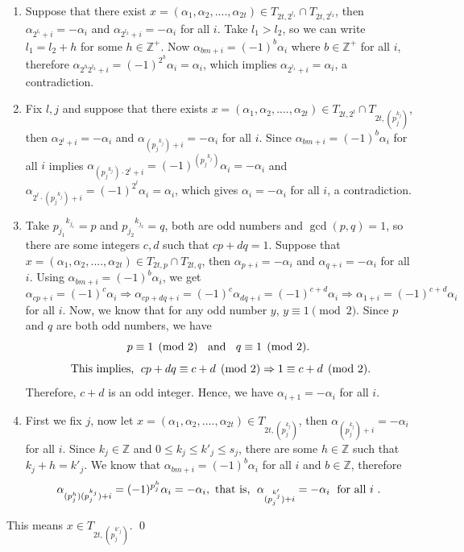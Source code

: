 \documentclass[a4paper,12pt]{amsart}
\renewenvironment{proof}{{\bfseries Proof.}}{\qed}
\numberwithin{equation}{section}
\theoremstyle{definition}
\newcommand{\imp}{\Rightarrow}
\newcommand{\z}{\mathbb{Z}}
\numberwithin{equation}{section}
\begin{document}
\begin{proof}
\begin {enumerate}
\item Suppose that there exist $x = (\alpha_1,\alpha_2,....,\alpha_{2t}) \in T_{2t, 2^{l_1}} \cap T_{2t, 2^{l_2}}$, then $\alpha_{2^{l_!}+i}=-\alpha_i$ and $\alpha_{2^{l_2}+i}=-\alpha_i$ for all $i$. Take $l_1 >l_2$, so we can write $l_1 = l_2+h $ for some $h \in \mathbb{Z}^+$. Now $\alpha_{bm +i}=(-1)^b \alpha_i$ where $b \in \mathbb{Z}^+$ for all $i$, therefore $\alpha_{2^h 2^{l_2} +i} =(-1)^{2^h}\alpha_i=\alpha_i$, which implies $\alpha_{2^{l_1}+i}=\alpha_i$, a contradiction.

\item Fix $l, j$ and suppose that there exists $x = (\alpha_1,\alpha_2,....,\alpha_{2t}) \in T_{2t, 2^{l}} \cap T_{2t, (p_j^{k_j})}$, then $\alpha_{2^l + i}=-\alpha_i$ and $\alpha_{({p_j}^{k_j})+i}=-\alpha_i$ for all $i$. Since $\alpha_{bm+i}=(-1)^b \alpha_i$  for all $i$ implies $\alpha_{({p_j}^{k_j})\cdot2^l+i}=(-1)^{({p_j}^{k_j})}\alpha_i=-\alpha_i$ and $\alpha_{2^l \cdot ({p_j}^{k_j})+i}=(-1)^{2^l}\alpha_i=\alpha_i$, which gives $\alpha_i=-\alpha_i$ for all $i$, a contradiction.
\item Take $ {p_{j_1}}^{k_{j_1}} = p$ and ${p_{j_2}}^{k_{j_2}}=q$, both are odd numbers and $\gcd(p,q)=1$, so there are some integers $c, d$ such that $cp+dq=1$. Suppose that $x = (\alpha_1,\alpha_2,....,\alpha_{2t}) \in T_{2t,p} \cap T_{2t, q}$, then $\alpha_{p+i}=-\alpha_i$ and $\alpha_{q+i}=-\alpha_i$ for all $i$. Using $\alpha_{bm+i}=(-1)^b\alpha_i$, we get $$ \alpha_{cp+i}=(-1)^c\alpha_i \imp \alpha_{cp+dq+i}=(-1)^c\alpha_{dq+i} =(-1)^{c+d}\alpha_i \imp \alpha_{1+i}=(-1)^{c+d}\alpha_i$$for all  $i$.
    Now, we know that for any odd number $y$, $y \equiv 1 \pmod 2$. Since $p$ and $q$ are both odd numbers, we have$$ p \equiv 1\pmod 2 \text{ \;\;and \;\;} q \equiv 1\pmod 2. $$ 
    $$ \text{ This implies,\; } cp+dq \equiv c+d\pmod2 \imp 1 \equiv c+d \pmod2. $$Therefore, $c+d$ is an odd integer. Hence, we have $\alpha_{i+1}=-\alpha_i$ for all $i$.
\item First we fix $j$, now let $x= (\alpha_1,\alpha_2,....,\alpha_{2t})\in T_{2t, (p_j^{k_j})}$, then $\alpha_{(p_j^{k_j})+i}=-\alpha_i$ for all $i$. Since $k_j \in \mathbb{Z}$ and $0 \leq k_j \leq k'_j\leq s_j$, there are some $h \in \mathbb{Z}$ such that $k_j + h = k'_j$. We know that $\alpha_{bm +i}=(-1)^b\alpha_i$ for all $i$ and $b\in \z $, therefore $$ \alpha_{(p_j^h)(p_j^{k_j})+i}=(-1)^{p_j^h}\alpha_i=-\alpha_i, \text{ that is, \;}  \alpha_{(p_j^{k'_j})+i}=-\alpha_i  \text{\; for all $i$ }.$$ 
\end{enumerate}
This means $x \in T_{2t, (p_j^{k'_j})}$. 
\end{proof}
\end{document}
